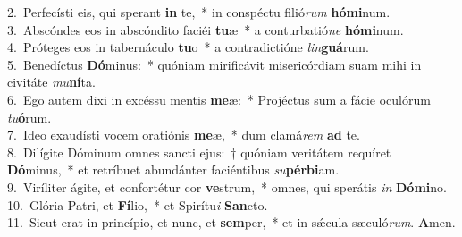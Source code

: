 {2.~}Perfecísti eis, qui sperant \textbf{in} te,~* in conspéctu filió\textit{rum} \textbf{hó}\textbf{mi}num.\\
{3.~}Abscóndes eos in abscóndito faciéi \textbf{tu}æ~* a conturbatió\textit{ne} \textbf{hó}\textbf{mi}num.\\
{4.~}Próteges eos in tabernáculo \textbf{tu}o~* a contradictióne \textit{lin}\textbf{guá}rum.\\
{5.~}Benedíctus \textbf{Dó}minus:~* quóniam mirificávit misericórdiam suam mihi in civitáte \textit{mu}\textbf{ní}ta.\\
{6.~}Ego autem dixi in excéssu mentis \textbf{me}æ:~* Projéctus sum a fácie oculórum \textit{tu}\textbf{ó}rum.\\
{7.~}Ideo exaudísti vocem oratiónis \textbf{me}æ,~* dum clamá\textit{rem} \textbf{ad} te.\\
{8.~}Dilígite Dóminum omnes sancti ejus:~† quóniam veritátem requíret \textbf{Dó}minus,~* et retríbuet abundánter faciéntibus \textit{su}\textbf{pér}\textbf{bi}am.\\
{9.~}Viríliter ágite, et confortétur cor \textbf{ve}strum,~* omnes, qui sperátis \textit{in} \textbf{Dó}\textbf{mi}no.\\
{10.~}Glória Patri, et \textbf{Fí}lio,~* et Spirítu\textit{i} \textbf{San}cto.\\
{11.~}Sicut erat in princípio, et nunc, et \textbf{sem}per,~* et in sǽcula sæculó\textit{rum}. \textbf{A}men.\\
